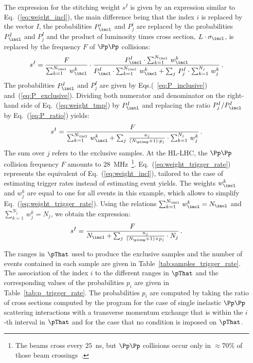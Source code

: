The expression for the stitching weight $s^{I}$ is given by an expression similar to Eq.~(\ref{eq:weight_incl}),
the main difference being that the index $i$ is replaced by the vector $I$,
the probabilities $P_{\incl}^{i}$ and $P_{j}^{i}$ are replaced by the probabilities $P_{\incl}^{I}$ and $P_{j}^{I}$
and the product of luminosity times cross section, $L \cdot \sigma_{\incl}$, is replaced by the frequency $F$ of $\Pp\Pp$ collisions:
\begin{equation}
s^{I} = \frac{F}{\sum_{k=1}^{N_{\incl}} \, w_{\incl}^{k}} \cdot \frac{P_{\incl}^{I} \cdot \sum_{k=1}^{N_{\incl}} \, w_{\incl}^{k}}{P_{\incl}^{I} \cdot \sum_{k=1}^{N_{\incl}} \, w_{\incl}^{k} + \sum_{j} \, P_{j}^{I} \cdot \sum_{k=1}^{N_{j}} \, w_{j}^{k}} \, .
\label{eq:weight_tmp}
\end{equation}
The probabilities $P_{\incl}^{I}$ and $P_{j}^{I}$ are given by Eqs.(~\ref{eq:P_inclusive}) and~(\ref{eq:P_exclusive}).
Dividing both numerator and denominator on the right-hand side of Eq.~(\ref{eq:weight_tmp}) by $P_{\incl}^{I}$ and replacing the ratio $P_{j}^{I}/P_{\incl}^{I}$ by Eq.~(\ref{eq:P_ratio}) yields:
\begin{equation}
s^{I} = \frac{F}{\sum_{k=1}^{N_{\incl}} \, w_{\incl}^{k} + \sum_{j} \, \frac{n_{j}}{(N_{\pileup} + 1) \cdot p_{j}} \cdot \sum_{k=1}^{N_{j}} \, w_{j}^{k}} \, .
\label{eq:weight_trigger_rate}
\end{equation}
The sum over $j$ refers to the exclusive samples.
At the HL-LHC, the $\Pp\Pp$ collision frequency $F$ amounts to $28$~MHz~\footnote{
  The beams cross every $25$~ns, but $\Pp\Pp$ collisions occur only in $\approx 70\%$ of those beam crossings~\cite{TDR_Phase2_LHC}.}.
Eq.~(\ref{eq:weight_trigger_rate}) represents the equivalent of Eq.~(\ref{eq:weight_incl}),
tailored to the case of estimating trigger rates instead of estimating event yields.
The weights $w_{\incl}^{k}$ and $w_{j}^{k}$ are equal to one for all events in this example,
which allows to simplify Eq.~(\ref{eq:weight_trigger_rate}).
Using the relations $\sum_{k=1}^{N_{\incl}} \, w_{\incl}^{k} = N_{\incl}$ and $\sum_{k=1}^{N_{j}} \, w_{j}^{k} = N_{j}$,
we obtain the expression:
\begin{equation}
s^{I} = \frac{F}{N_{\incl} + \sum_{j} \, \frac{n_{j}}{(N_{\pileup} + 1) \times p_{j}} \cdot N_{j}} \, .
\label{eq:weight_trigger_rate_simplified}
\end{equation}

The ranges in $\pThat$ used to produce the exclusive samples and the number of events contained in each sample
are given in Table~\ref{tab:samples_trigger_rate}.
The association of the index $i$ to the different ranges in $\pThat$ and the 
corresponding values of the probabilities $p_{i}$ are given in Table~\ref{tab:p_trigger_rate}.
The probabilities $p_{i}$ are computed by taking the ratio of cross sections computed by the program \PYTHIA
for the case of single inelastic $\Pp\Pp$ scattering interactions with a transverse momentum exchange that is within the $i$-th interval in $\pThat$
and for the case that no condition is imposed on $\pThat$.

